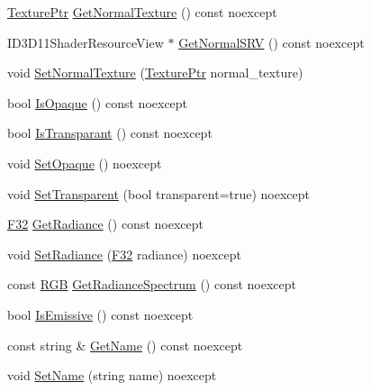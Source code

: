 \begin{DoxyCompactItemize}
\item 
\mbox{\hyperlink{namespacemage_1_1rendering_a6f3ae54f825328465b0cdde0f0de4a36}{Texture\+Ptr}} \mbox{\hyperlink{classmage_1_1rendering_1_1_material_a1ae7786ebd627d3e7ecaf2dc671f497d}{Get\+Normal\+Texture}} () const noexcept
\item 
I\+D3\+D11\+Shader\+Resource\+View $\ast$ \mbox{\hyperlink{classmage_1_1rendering_1_1_material_a8617392cee8e8609671be3f4147a5934}{Get\+Normal\+S\+RV}} () const noexcept
\item 
void \mbox{\hyperlink{classmage_1_1rendering_1_1_material_a1a1ae2ba12c62c1d076f04124f1f64f6}{Set\+Normal\+Texture}} (\mbox{\hyperlink{namespacemage_1_1rendering_a6f3ae54f825328465b0cdde0f0de4a36}{Texture\+Ptr}} normal\+\_\+texture)
\item 
bool \mbox{\hyperlink{classmage_1_1rendering_1_1_material_af750917e67bdaf7e47129617102887ab}{Is\+Opaque}} () const noexcept
\item 
bool \mbox{\hyperlink{classmage_1_1rendering_1_1_material_ae60d1b61ebd38d3e329a519b2f2c3dad}{Is\+Transparant}} () const noexcept
\item 
void \mbox{\hyperlink{classmage_1_1rendering_1_1_material_a23741c39e6ad9a8d12b7793bc3da4131}{Set\+Opaque}} () noexcept
\item 
void \mbox{\hyperlink{classmage_1_1rendering_1_1_material_a8da0e0ed4df1e9ce0c7381d88b6d6c48}{Set\+Transparent}} (bool transparent=true) noexcept
\item 
\mbox{\hyperlink{namespacemage_aa97e833b45f06d60a0a9c4fc22ae02c0}{F32}} \mbox{\hyperlink{classmage_1_1rendering_1_1_material_a5bfbc1bc67731126af7cf33b286bb07b}{Get\+Radiance}} () const noexcept
\item 
void \mbox{\hyperlink{classmage_1_1rendering_1_1_material_ae41261db79de572b75e2615abadc2aaa}{Set\+Radiance}} (\mbox{\hyperlink{namespacemage_aa97e833b45f06d60a0a9c4fc22ae02c0}{F32}} radiance) noexcept
\item 
const \mbox{\hyperlink{structmage_1_1_r_g_b}{R\+GB}} \mbox{\hyperlink{classmage_1_1rendering_1_1_material_af8a3171b34409593673f1279e3f9ba29}{Get\+Radiance\+Spectrum}} () const noexcept
\item 
bool \mbox{\hyperlink{classmage_1_1rendering_1_1_material_acf52f6bc5f849928751e10157bdb3c3c}{Is\+Emissive}} () const noexcept
\item 
const string \& \mbox{\hyperlink{classmage_1_1rendering_1_1_material_ab94089dbe7d1b242fad455e9c233a78c}{Get\+Name}} () const noexcept
\item 
void \mbox{\hyperlink{classmage_1_1rendering_1_1_material_a5700b990bfd59c497e07ee6682ffbf06}{Set\+Name}} (string name) noexcept
\end{DoxyCompactItemize}
